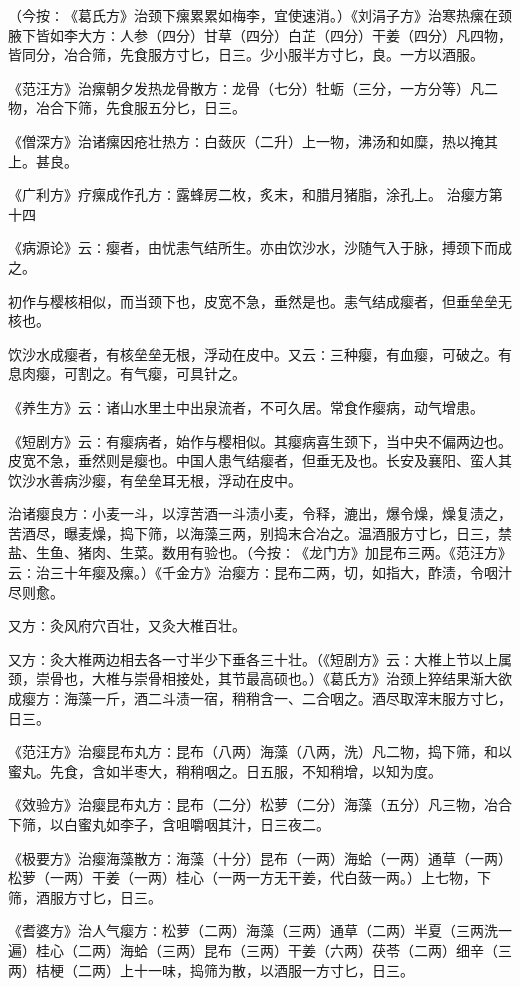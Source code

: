 \documentclass[a4paper,12pt,UTF8,twoside]{ctexbook}
\begin{document}
（今按∶《葛氏方》治颈下瘰累累如梅李，宜使速消。）《刘涓子方》治寒热瘰在颈腋下皆如李大方∶人参（四分）甘草（四分）白芷（四分）干姜（四分）凡四物，皆同分，冶合筛，先食服方寸匕，日三。少小服半方寸匕，良。一方以酒服。

《范汪方》治瘰朝夕发热龙骨散方∶龙骨（七分）牡蛎（三分，一方分等）凡二物，冶合下筛，先食服五分匕，日三。

《僧深方》治诸瘰因疮壮热方∶白蔹灰（二升）上一物，沸汤和如糜，热以掩其上。甚良。

《广利方》疗瘰成作孔方∶露蜂房二枚，炙末，和腊月猪脂，涂孔上。
治瘿方第十四

《病源论》云∶瘿者，由忧恚气结所生。亦由饮沙水，沙随气入于脉，搏颈下而成之。

初作与樱核相似，而当颈下也，皮宽不急，垂然是也。恚气结成瘿者，但垂垒垒无核也。

饮沙水成瘿者，有核垒垒无根，浮动在皮中。又云∶三种瘿，有血瘿，可破之。有息肉瘿，可割之。有气瘿，可具针之。

《养生方》云∶诸山水里土中出泉流者，不可久居。常食作瘿病，动气增患。

《短剧方》云∶有瘿病者，始作与樱相似。其瘿病喜生颈下，当中央不偏两边也。皮宽不急，垂然则是瘿也。中国人患气结瘿者，但垂无及也。长安及襄阳、蛮人其饮沙水善病沙瘿，有垒垒耳无根，浮动在皮中。

治诸瘿良方∶小麦一斗，以淳苦酒一斗渍小麦，令释，漉出，爆令燥，燥复渍之，苦酒尽，曝麦燥，捣下筛，以海藻三两，别捣末合冶之。温酒服方寸匕，日三，禁盐、生鱼、猪肉、生菜。数用有验也。（今按∶《龙门方》加昆布三两。《范汪方》云∶治三十年瘿及瘰。）《千金方》治瘿方∶昆布二两，切，如指大，酢渍，令咽汁尽则愈。

又方∶灸风府穴百壮，又灸大椎百壮。

又方∶灸大椎两边相去各一寸半少下垂各三十壮。（《短剧方》云∶大椎上节以上属颈，崇骨也，大椎与崇骨相接处，其节最高硕也。）《葛氏方》治颈上猝结果渐大欲成瘿方∶海藻一斤，酒二斗渍一宿，稍稍含一、二合咽之。酒尽取滓末服方寸匕，日三。

《范汪方》治瘿昆布丸方∶昆布（八两）海藻（八两，洗）凡二物，捣下筛，和以蜜丸。先食，含如半枣大，稍稍咽之。日五服，不知稍增，以知为度。

《效验方》治瘿昆布丸方∶昆布（二分）松萝（二分）海藻（五分）凡三物，冶合下筛，以白蜜丸如李子，含咀嚼咽其汁，日三夜二。

《极要方》治瘿海藻散方∶海藻（十分）昆布（一两）海蛤（一两）通草（一两）松萝（一两）干姜（一两）桂心（一两一方无干姜，代白蔹一两。）上七物，下筛，酒服方寸匕，日三。

《耆婆方》治人气瘿方∶松萝（二两）海藻（三两）通草（二两）半夏（三两洗一遍）桂心（二两）海蛤（三两）昆布（三两）干姜（六两）茯苓（二两）细辛（三两）桔梗（二两）上十一味，捣筛为散，以酒服一方寸匕，日三。
\end{document}
